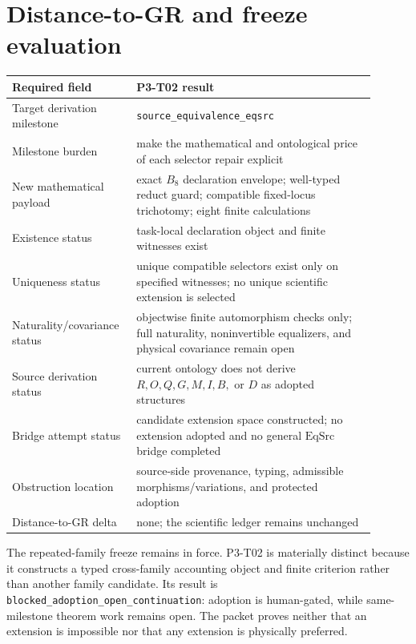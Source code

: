 \documentclass[11pt]{article}
\newcommand{\EqSrc}{\ensuremath{\mathrm{EqSrc}}}
\begin{document}
\section{Distance-to-GR and freeze evaluation}

\begin{longtable}{>{\raggedright\arraybackslash}p{0.28\linewidth}
                  >{\raggedright\arraybackslash}p{0.62\linewidth}}
\toprule
Required field & P3-T02 result\\
\midrule
\endhead
Target derivation milestone & \texttt{source\_equivalence\_eqsrc}\\
Milestone burden & make the mathematical and ontological price of each selector repair explicit\\
New mathematical payload & exact \(B_8\) declaration envelope; well-typed reduct guard; compatible fixed-locus trichotomy; eight finite calculations\\
Existence status & task-local declaration object and finite witnesses exist\\
Uniqueness status & unique compatible selectors exist only on specified witnesses; no unique scientific extension is selected\\
Naturality/covariance status & objectwise finite automorphism checks only; full naturality, noninvertible equalizers, and physical covariance remain open\\
Source derivation status & current ontology does not derive \(R,O,Q,G,M,I,B,\) or \(D\) as adopted structures\\
Bridge attempt status & candidate extension space constructed; no extension adopted and no general \(\EqSrc\) bridge completed\\
Obstruction location & source-side provenance, typing, admissible morphisms/variations, and protected adoption\\
Distance-to-GR delta & none; the scientific ledger remains unchanged\\
\bottomrule
\end{longtable}

The repeated-family freeze remains in force.  P3-T02 is materially distinct
because it constructs a typed cross-family accounting object and finite
criterion rather than another family candidate.  Its result is
\texttt{blocked\_adoption\_open\_continuation}: adoption is human-gated, while
same-milestone theorem work remains open.  The packet proves neither that an
extension is impossible nor that any extension is physically preferred.
\end{document}
